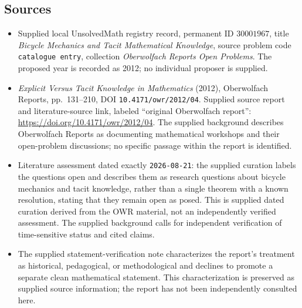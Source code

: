 \documentclass[11pt]{article}
\begin{document}
\subsection{Sources}
\begin{itemize}
\item Supplied local UnsolvedMath registry record, permanent ID \(30001967\), title \emph{Bicycle Mechanics and Tacit Mathematical Knowledge}, source problem code \texttt{catalogue entry}, collection \emph{Oberwolfach Reports Open Problems}. The proposed year is recorded as 2012; no individual proposer is supplied.
\item \emph{Explicit Versus Tacit Knowledge in Mathematics} (2012), Oberwolfach Reports, pp.~131--210, DOI \texttt{10.4171/owr/2012/04}. Supplied source report and literature-source link, labeled ``original Oberwolfach report'': \url{https://doi.org/10.4171/owr/2012/04}. The supplied background describes Oberwolfach Reports as documenting mathematical workshops and their open-problem discussions; no specific passage within the report is identified.
\item Literature assessment dated exactly \texttt{2026-08-21}: the supplied curation labels the questions open and describes them as research questions about bicycle mechanics and tacit knowledge, rather than a single theorem with a known resolution, stating that they remain open as posed. This is supplied dated curation derived from the OWR material, not an independently verified assessment. The supplied background calls for independent verification of time-sensitive status and cited claims.
\item The supplied statement-verification note characterizes the report's treatment as historical, pedagogical, or methodological and declines to promote a separate clean mathematical statement. This characterization is preserved as supplied source information; the report has not been independently consulted here.
\end{itemize}
\end{document}
